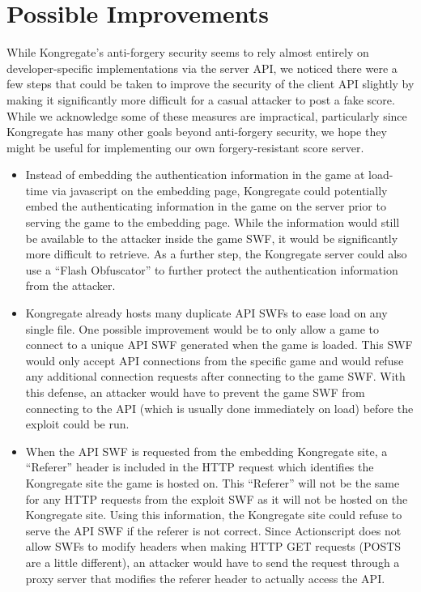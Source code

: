 \documentclass [11pt,twocolumn] {article}
\begin{document}
\section { Possible Improvements } 

While Kongregate's anti-forgery security seems to rely almost entirely on developer-specific implementations via the server API, we noticed there were a few steps that could be taken to improve the security of the client API slightly by making it significantly more difficult for a casual attacker to post a fake score. While we acknowledge some of these measures are impractical, particularly since Kongregate has many other goals beyond anti-forgery security, we hope they might be useful for implementing our own forgery-resistant score server.  

\begin {itemize} 

\item Instead of embedding the authentication information in the game at load-time via javascript on the embedding page, Kongregate could potentially embed the authenticating information in the game on the server prior to serving the game to the embedding page. While the information would still be available to the attacker inside the game SWF, it would be significantly more difficult to retrieve. As a further step, the Kongregate server could also use a ``Flash Obfuscator'' to further protect the authentication information from the attacker.

\item Kongregate already hosts many duplicate API SWFs to ease load on any single file. One possible improvement would be to only allow a game to connect to a unique API SWF generated when the game is loaded. This SWF would only accept API connections from the specific game and would refuse any additional connection requests after connecting to the game SWF. With this defense, an attacker would have to prevent the game SWF from connecting to the API (which is usually done immediately on load) before the exploit could be run. 

\item When the API SWF is requested from the embedding Kongregate site, a ``Referer'' header is included in the HTTP request which identifies the Kongregate site the game is hosted on. This ``Referer'' will not be the same for any HTTP requests from the exploit SWF as it will not be hosted on the Kongregate site. Using this information, the Kongregate site could refuse to serve the API SWF if the referer is not correct. Since Actionscript does not allow SWFs to modify headers when making HTTP GET requests (POSTS are a little different), an attacker would have to send the request through a proxy server that modifies the referer header to actually access the API. 

\end {itemize}  
\end{document}
